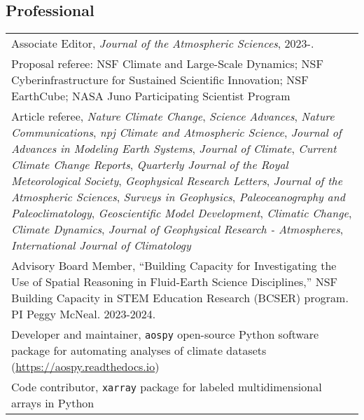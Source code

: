 \documentclass[letterpaper,11pt]{shillcv}
\begin{document}
\subsection*{Professional}
\begin{longtable}{@{} L{\textwidth} @{}}

Associate Editor, \emph{Journal of the Atmospheric Sciences}, 2023-.\\


Proposal referee: NSF Climate and Large-Scale Dynamics; NSF Cyberinfrastructure for Sustained Scientific Innovation; NSF EarthCube; NASA Juno Participating Scientist Program\\

Article referee, \emph{Nature Climate Change}, \emph{Science Advances}, \emph{Nature Communications}, \emph{npj Climate and Atmospheric Science}, \emph{Journal of Advances in Modeling Earth Systems}, \emph{Journal of Climate}, \emph{Current Climate Change Reports}, \emph{Quarterly Journal of the Royal Meteorological Society}, \emph{Geophysical Research Letters}, \emph{Journal of the Atmospheric Sciences}, \emph{Surveys in Geophysics}, \emph{Paleoceanography and Paleoclimatology}, \emph{Geoscientific Model Development}, \emph{Climatic Change}, \emph{Climate Dynamics}, \emph{Journal of Geophysical Research - Atmospheres}, \emph{International Journal of Climatology}\\

Advisory Board Member, ``Building Capacity for Investigating the Use of Spatial Reasoning in Fluid-Earth Science Disciplines,'' NSF Building Capacity in STEM Education Research (BCSER) program.  PI Peggy McNeal.  2023-2024.\\

Developer and maintainer, \texttt{aospy} open-source Python software package for automating analyses of climate datasets (\href{https://aospy.readthedocs.io}{https://aospy.readthedocs.io})\\

Code contributor, \texttt{xarray} package for labeled multidimensional arrays in Python\\
\end{longtable}
\end{document}
